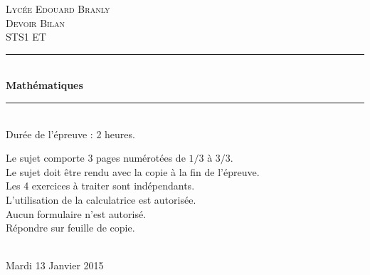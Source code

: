 \documentclass[12pt]{article}
\begin{document}
\newpage


\begin{titlepage}

  \newcommand{\HRule}{\rule{\linewidth}{0.5mm}} %

  \center %
  
  \textsc{\LARGE Lycée Edouard Branly}\\[1.5cm] %
  
  \textsc{\Large Devoir Bilan}\\[0.5cm] %

  \textsc{\large STS1 ET}\\[0.5cm] %

  \HRule \\[0.4cm]

  { \huge \bfseries Mathématiques}\\[0.4cm] %
  
  \HRule\\[2cm]

  {\huge Durée de l'épreuve : 2 heures.}\\[1.5cm]
  
  \begin{minipage}{0.8\textwidth}
    \begin{flushleft} \large
      Le sujet comporte $3$  pages numérotées de   $1/3$   à  $3/3$.\\
      Le sujet doit être rendu avec la copie à la fin de l’épreuve.\\
      Les 4 exercices à traiter sont indépendants.\\
      L'utilisation de la calculatrice est autorisée.\\
      Aucun formulaire n'est autorisé.\\
      Répondre sur feuille de copie.\\
    \end{flushleft}
  \end{minipage}\\[4cm]

  {\huge Mardi 13 Janvier 2015}\\[3cm] 

  \vfill %

\end{titlepage}
\end{document}
